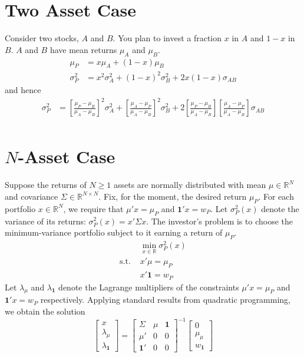 \documentclass[12pt]{article}
\begin{document}
	\onehalfspacing
\section{Two Asset Case}
	Consider two stocks, $A$ and $B$. You plan to invest a fraction $x$ in $A$ and $1-x$ in $B$. $A$ and $B$ have mean returns $\mu_{A}$ and $\mu_{B}$. 
	\begin{align}
		\mu_{P}&=x\mu_{A}+(1-x)\mu_{B}\\
		\sigma_{P}^{2}&=x^{2}\sigma_{A}^{2}+(1-x)^{2}\sigma_{B}^{2}+2x(1-x)\sigma_{AB}
	\end{align}
	and hence
	\begin{align}
		\sigma_{P}^{2}&=\left[\frac{\mu_{P}-\mu_{B}}{\mu_{A}-\mu_{B}}\right]^{2}\sigma_{A}^{2}+\left[\frac{\mu_{A}-\mu_{P}}{\mu_{A}-\mu_{B}}\right]^{2}\sigma_{B}^{2}+2\left[\frac{\mu_{P}-\mu_{B}}{\mu_{A}-\mu_{B}}\right]\left[\frac{\mu_{A}-\mu_{P}}{\mu_{A}-\mu_{B}}\right]\sigma_{AB}\\
	\end{align}
\section{$N$-Asset Case}
	Suppose the returns of $N\geq1$ assets are normally distributed with mean $\mu\in\mathbb{R}^{N}$ and covariance $\Sigma\in\mathbb{R}^{N\times N}$. Fix, for the moment, the desired return $\mu_{P}$. For each portfolio $x\in\mathbb{R}^{N}$, we require that $\mu'x=\mu_{P}$ and $\mathbf{1}'x=w_{P}$. Let $\sigma_{P}^{2}(x)$ denote the variance of its returns: $\sigma_{P}^{2}(x)=x'\Sigma x$. The investor's problem is to choose the minimum-variance portfolio subject to it earning a return of $\mu_{P}$. 
\begin{equation}
	\begin{array}{rl}
		&\min_{x\in\mathbb{R}}\sigma_{P}^{2}(x)\\
		\text{s.t. }&x'\mu=\mu_{P}\\
		&x'\mathbf{1}=w_{P}
	\end{array}
\end{equation}
Let $\lambda_{\mu}$ and $\lambda_{\mathbf{1}}$ denote the Lagrange multipliers of the constraints $\mu'x=\mu_{P}$ and $\mathbf{1}'x=w_{P}$ respectively. Applying standard results from quadratic programming, we obtain the solution 
\begin{equation}
\left[
\begin{array}{c}
x \\
\lambda_{\mu}\\
\lambda_{\mathbf{1}}
\end{array}
\right]
=
\left[
\begin{array}{ccc}
\Sigma & \mu & \mathbf{1} \\
\mu' & 0 & 0 \\
\mathbf{1}' & 0 & 0
\end{array}
\right]^{-1}
\left[
\begin{array}{c}
0 \\
\mu_{\mu}\\
w_{\mathbf{1}}
\end{array}
\right]
\end{equation}
\end{document}
